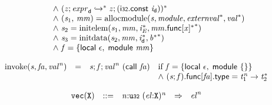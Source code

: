 $$\begin{array}{@{}lcl@{}l@{}}
 &&&\quad {\land}~({\mathit{z}} ; {\mathit{expr}}_{{\mathsf{d}}} \hookrightarrow^\ast {\mathit{z}} ; (\mathsf{i{\scriptstyle32}}.\mathsf{const}~{\mathit{i}}_{{\mathsf{d}}}))^\ast \\
 &&&\quad {\land}~({\mathit{s}}_{{1}},\, {\mathit{mm}}) = {\mathrm{allocmodule}}({\mathit{s}}, {\mathit{module}}, {{\mathit{externval}}^\ast}, {{\mathit{val}}^\ast}) \\
 &&&\quad {\land}~{\mathit{s}}_{{2}} = {\mathrm{initelem}}({\mathit{s}}_{{1}}, {\mathit{mm}}, {{\mathit{i}}_{{\mathit{E}}}^\ast}, {{{\mathit{mm}}.\mathsf{func}[{\mathit{x}}]^\ast}^\ast}) \\
 &&&\quad {\land}~{\mathit{s}}_{{3}} = {\mathrm{initdata}}({\mathit{s}}_{{2}}, {\mathit{mm}}, {{\mathit{i}}_{{\mathsf{d}}}^\ast}, {{{\mathit{b}}^\ast}^\ast}) \\
 &&&\quad {\land}~{\mathit{f}} = \{ \begin{array}[t]{@{}l@{}}
\mathsf{local}~\epsilon,\; \mathsf{module}~{\mathit{mm}} \}\end{array} \\
\end{array}
$$

\vspace{1ex}

$$
\begin{array}{@{}lcl@{}l@{}}
{\mathrm{invoke}}({\mathit{s}}, {\mathit{fa}}, {{\mathit{val}}^{{\mathit{n}}}}) &=& {\mathit{s}} ; {\mathit{f}} ; {{\mathit{val}}^{{\mathit{n}}}}~(\mathsf{call}~{\mathit{fa}}) &\quad
  \mbox{if}~{\mathit{f}} = \{ \begin{array}[t]{@{}l@{}}
\mathsf{local}~\epsilon,\; \mathsf{module}~\{ \begin{array}[t]{@{}l@{}}
 \}\end{array} \}\end{array} \\
 &&&\quad {\land}~({\mathit{s}} ; {\mathit{f}}).\mathsf{func}[{\mathit{fa}}].\mathsf{type} = {{\mathit{t}}_{{1}}^{{\mathit{n}}}} \rightarrow {{\mathit{t}}_{{2}}^\ast} \\
\end{array}
$$

\vspace{1ex}

$$
\begin{array}{@{}l@{}rrlll@{}l@{}}
& {\mathtt{vec}}({\mathtt{X}}) &::=& {\mathit{n}}{:}{\mathtt{u{\scriptstyle32}}}~{({\mathit{el}}{:}{\mathtt{X}})^{{\mathit{n}}}} &\Rightarrow& {{\mathit{el}}^{{\mathit{n}}}} \\
\end{array}
$$

